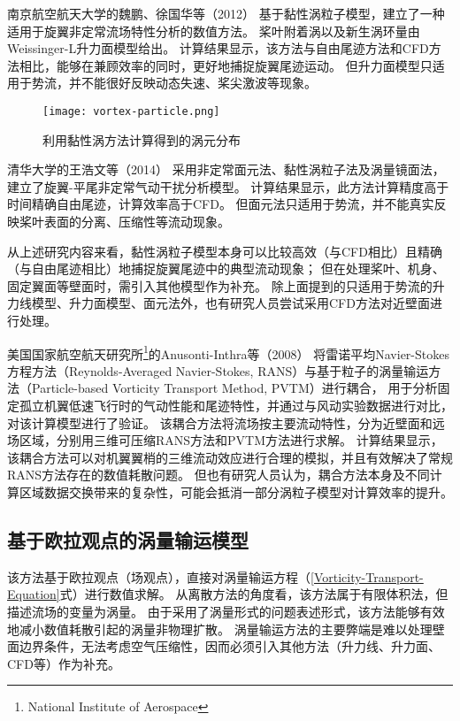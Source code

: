 \documentclass[doctor,openright,twoside,color]{buaathesis}
\begin{document}
南京航空航天大学的魏鹏、徐国华等（2012）
基于黏性涡粒子模型，建立了一种适用于旋翼非定常流场特性分析的数值方法。
桨叶附着涡以及新生涡环量由Weissinger-L升力面模型给出。
计算结果显示，该方法与自由尾迹方法和CFD方法相比，能够在兼顾效率的同时，更好地捕捉旋翼尾迹运动。
但升力面模型只适用于势流，并不能很好反映动态失速、桨尖激波等现象。
\begin{figure}[t!]
    \centering
    \texttt{[image: vortex-particle.png]}
    \caption{利用黏性涡方法计算得到的涡元分布}\label{vortex-particle}
\end{figure}

清华大学的王浩文等（2014）
采用非定常面元法、黏性涡粒子法及涡量镜面法，建立了旋翼-平尾非定常气动干扰分析模型。
计算结果显示，此方法计算精度高于时间精确自由尾迹，计算效率高于CFD。
但面元法只适用于势流，并不能真实反映桨叶表面的分离、压缩性等流动现象。

从上述研究内容来看，黏性涡粒子模型本身可以比较高效（与CFD相比）且精确（与自由尾迹相比）地捕捉旋翼尾迹中的典型流动现象；
但在处理桨叶、机身、固定翼面等壁面时，需引入其他模型作为补充。
除上面提到的只适用于势流的升力线模型、升力面模型、面元法外，也有研究人员尝试采用CFD方法对近壁面进行处理。

美国国家航空航天研究所\footnote{National Institute of Aerospace}的Anusonti-Inthra等（2008）
将雷诺平均Navier-Stokes方程方法（Reynolds-Averaged Navier-Stokes, RANS）与基于粒子的涡量输运方法（Particle-based Vorticity Transport Method, PVTM）进行耦合，
用于分析固定孤立机翼低速飞行时的气动性能和尾迹特性，并通过与风动实验数据进行对比，对该计算模型进行了验证。
该耦合方法将流场按主要流动特性，分为近壁面和远场区域，分别用三维可压缩RANS方法和PVTM方法进行求解。
计算结果显示，该耦合方法可以对机翼翼梢的三维流动效应进行合理的模拟，并且有效解决了常规RANS方法存在的数值耗散问题。
但也有研究人员认为，耦合方法本身及不同计算区域数据交换带来的复杂性，可能会抵消一部分涡粒子模型对计算效率的提升。

\subsection{基于欧拉观点的涡量输运模型}\label{Vorticity-Transport-Model}
该方法基于欧拉观点（场观点），直接对涡量输运方程（\ref{Vorticity-Transport-Equation}式）进行数值求解。
从离散方法的角度看，该方法属于有限体积法，但描述流场的变量为涡量。
由于采用了涡量形式的问题表述形式，该方法能够有效地减小数值耗散引起的涡量非物理扩散。
涡量输运方法的主要弊端是难以处理壁面边界条件，无法考虑空气压缩性，因而必须引入其他方法（升力线、升力面、CFD等）作为补充。
\end{document}
